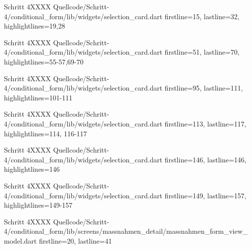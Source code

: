 










\begin{alexlistingzwei}{Schritt 4}{XXXX}
    {Quellcode/Schritt-4/conditional_form/lib/widgets/selection_card.dart}
    {firstline=15, lastline=32, highlightlines={19,28}}
    \label{lst:Schritt4XXXX}
\end{alexlistingzwei}

\begin{alexlistingzwei}{Schritt 4}{XXXX}
    {Quellcode/Schritt-4/conditional_form/lib/widgets/selection_card.dart}
    {firstline=51, lastline=70, highlightlines={55-57,69-70}}
    \label{lst:Schritt4XXXX}
\end{alexlistingzwei}

\begin{alexlistingzwei}{Schritt 4}{XXXX}
    {Quellcode/Schritt-4/conditional_form/lib/widgets/selection_card.dart}
    {firstline=95, lastline=111, highlightlines={101-111}}
    \label{lst:Schritt4XXXX}
\end{alexlistingzwei}


\begin{alexlistingzwei}{Schritt 4}{XXXX}
    {Quellcode/Schritt-4/conditional_form/lib/widgets/selection_card.dart}
    {firstline=113, lastline=117, highlightlines={114, 116-117}}
    \label{lst:Schritt4XXXX}
\end{alexlistingzwei}

\begin{alexlistingzwei}{Schritt 4}{XXXX}
    {Quellcode/Schritt-4/conditional_form/lib/widgets/selection_card.dart}
    {firstline=146, lastline=146, highlightlines={146}}
    \label{lst:Schritt4XXXX}
\end{alexlistingzwei}

\begin{alexlistingzwei}{Schritt 4}{XXXX}
    {Quellcode/Schritt-4/conditional_form/lib/widgets/selection_card.dart}
    {firstline=149, lastline=157, highlightlines={149-157}}
    \label{lst:Schritt4XXXX}
\end{alexlistingzwei}


\begin{alexlistingzwei}{Schritt 4}{XXXX}
    {Quellcode/Schritt-4/conditional_form/lib/screens/massnahmen_detail/massnahmen_form_view_model.dart}
    {firstline=20, lastline=41}
    \label{lst:Schritt4XXXXX}
  \end{alexlistingzwei}

